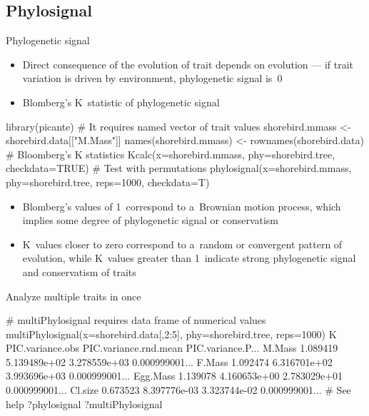 \documentclass[compress, ucs, xelatex, 11pt, xcolor=svgnames, aspectratio=169,
	hyperref={
		bookmarks=true,
		unicode=true,
		colorlinks=true,
		pdftitle={Molecular data in R},
		plainpages=false,
		pdfauthor={Vojtech Zeisek},
		pdfsubject={Course about phylogeny and evolution in R},
		pdfcreator={XeLaTeX},
		pdfkeywords={R, evolution, phylogeny, molecular data},
		linkcolor=Crimson, %
		anchorcolor=Magenta, %
		citecolor=Magenta, %
		filecolor=Magenta, %
		menucolor=Magenta, %
		urlcolor=DodgerBlue, %
		pdftex},
	url={hyphens, lowtilde} %
	]{beamer}
\begin{document}
\subsection{Phylosignal}

\begin{frame}[fragile]{Phylogenetic signal}
	\begin{itemize}
		\item Direct consequence of the evolution of trait depends on evolution --- if trait variation is driven by environment, phylogenetic signal is~0
		\item Blomberg's K~statistic of phylogenetic signal
	\end{itemize}
	\begin{spluscode}
    library(picante)
    # It requires named vector of trait values
    shorebird.mmass <- shorebird.data[["M.Mass"]]
    names(shorebird.mmass) <- rownames(shorebird.data)
    # Bloomberg's K statistics
    Kcalc(x=shorebird.mmass, phy=shorebird.tree, checkdata=TRUE)
    # Test with permutations
    phylosignal(x=shorebird.mmass, phy=shorebird.tree, reps=1000, checkdata=T)
\end{spluscode}
	\begin{itemize}
		\item Blomberg's values of 1~correspond to a~Brownian motion process, which implies some degree of phylogenetic signal or conservatism
		\item K~values closer to zero correspond to a~random or convergent pattern of evolution, while K~values greater than 1~indicate strong phylogenetic signal and conservatism of traits
	\end{itemize}
\end{frame}

\begin{frame}[fragile]{Analyze multiple traits in once}
	\begin{spluscode}
    # multiPhylosignal requires data frame of numerical values
    multiPhylosignal(x=shorebird.data[,2:5], phy=shorebird.tree, reps=1000)
                    K PIC.variance.obs PIC.variance.rnd.mean PIC.variance.P...
    M.Mass   1.089419     5.139489e+02          3.278559e+03    0.000999001...
    F.Mass   1.092474     6.316701e+02          3.993696e+03    0.000999001...
    Egg.Mass 1.139078     4.160653e+00          2.783029e+01    0.000999001...
    Cl.size  0.673523     8.397776e-03          3.323744e-02    0.000999001...
    # See help
    ?phylosignal
    ?multiPhylosignal
	\end{spluscode}
\end{frame}
\end{document}
